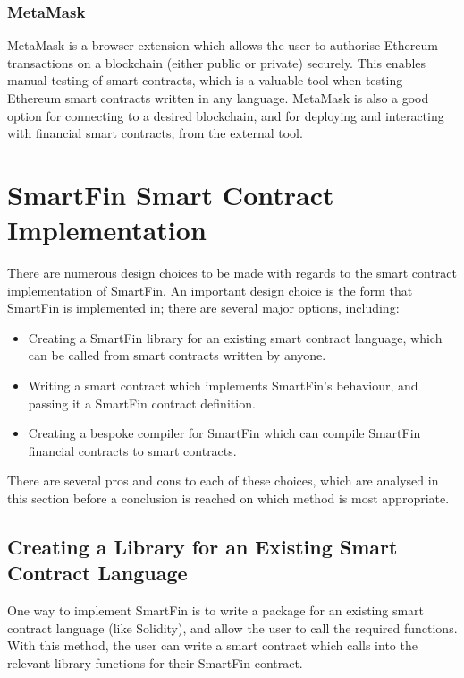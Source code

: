 \subsubsection{MetaMask}

MetaMask is a browser extension which allows the user to authorise Ethereum transactions on a blockchain (either public or private) securely\cite{MMSK}. This enables manual testing of smart contracts, which is a valuable tool when testing Ethereum smart contracts written in any language. MetaMask is also a good option for connecting to a desired blockchain, and for deploying and interacting with financial smart contracts, from the external tool.


\section{SmartFin Smart Contract Implementation} \label{DSL-implementation-technologies}

There are numerous design choices to be made with regards to the smart contract implementation of SmartFin. An important design choice is the form that SmartFin is implemented in; there are several major options, including:
\begin{itemize}
    \item Creating a SmartFin library for an existing smart contract language, which can be called from smart contracts written by anyone.
    \item Writing a smart contract which implements SmartFin's behaviour, and passing it a SmartFin contract definition.
    \item Creating a bespoke compiler for SmartFin which can compile SmartFin financial contracts to smart contracts. \\
\end{itemize}

There are several pros and cons to each of these choices, which are analysed in this section before a conclusion is reached on which method is most appropriate.

\subsection{Creating a Library for an Existing Smart Contract Language}

One way to implement SmartFin is to write a package for an existing smart contract language (like Solidity), and allow the user to call the required functions. With this method, the user can write a smart contract which calls into the relevant library functions for their SmartFin contract.

